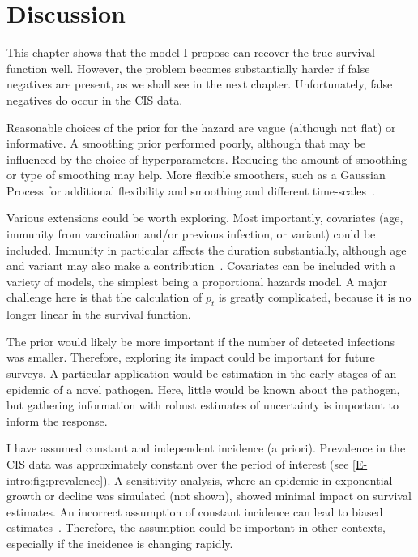 \documentclass[thesis.tex]{subfiles}
\begin{document}
\section{Discussion} \label{perf-test:sec:discussion}

This chapter shows that the model I propose can recover the true survival function well.
However, the problem becomes substantially harder if false negatives are present, as we shall see in the next chapter.
Unfortunately, false negatives do occur in the CIS data.

Reasonable choices of the prior for the hazard are vague (although not flat) or informative.
A smoothing prior performed poorly, although that may be influenced by the choice of hyperparameters.
Reducing the amount of smoothing or type of smoothing may help.
More flexible smoothers, such as a Gaussian Process for additional flexibility and smoothing and different time-scales~\autocite{saulGaussian}.

Various extensions could be worth exploring.
Most importantly, covariates (\eg age, immunity from vaccination and/or previous infection, or variant) could be included.
Immunity in particular affects the duration substantially, although age and variant may also make a contribution~\autocites{hakkiOnset}{russellWithinhost}.
Covariates can be included with a variety of models, the simplest being a proportional hazards model.
A major challenge here is that the calculation of $p_t$ is greatly complicated, because it is no longer linear in the survival function.

The prior would likely be more important if the number of detected infections was smaller.
Therefore, exploring its impact could be important for future surveys.
A particular application would be estimation in the early stages of an epidemic of a novel pathogen.
Here, little would be known about the pathogen, but gathering information with robust estimates of uncertainty is important to inform the response.

I have assumed constant and independent incidence (a priori).
Prevalence in the CIS data was approximately constant over the period of interest (see \cref{E-intro:fig:prevalence}).
A sensitivity analysis, where an epidemic in exponential growth or decline was simulated (not shown), showed minimal impact on survival estimates.
An incorrect assumption of constant incidence can lead to biased estimates~\autocite{degruttolaAnalysis}.
Therefore, the assumption could be important in other contexts, especially if the incidence is changing rapidly.
\end{document}
